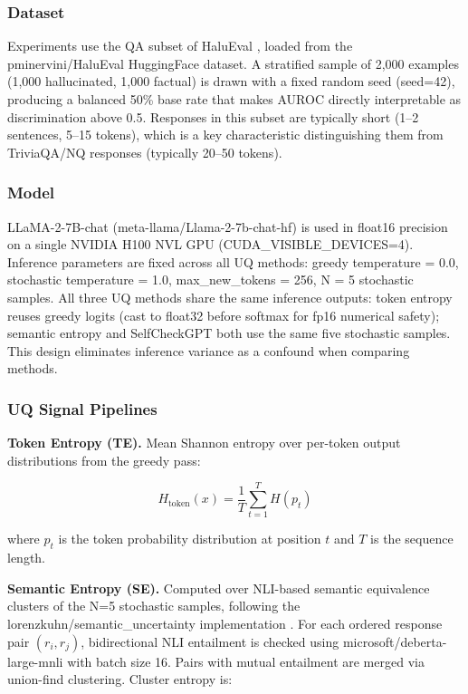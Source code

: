 
\subsubsection{Dataset}

Experiments use the QA subset of HaluEval \citep{Lietal2023}, loaded from the pminervini/HaluEval HuggingFace dataset. A stratified sample of 2,000 examples (1,000 hallucinated, 1,000 factual) is drawn with a fixed random seed (seed=42), producing a balanced 50\% base rate that makes AUROC directly interpretable as discrimination above 0.5. Responses in this subset are typically short (1–2 sentences, 5–15 tokens), which is a key characteristic distinguishing them from TriviaQA/NQ responses (typically 20–50 tokens).

\subsubsection{Model}

LLaMA-2-7B-chat (meta-llama/Llama-2-7b-chat-hf) is used in float16 precision on a single NVIDIA H100 NVL GPU (CUDA_VISIBLE_DEVICES=4). Inference parameters are fixed across all UQ methods: greedy temperature = 0.0, stochastic temperature = 1.0, max_new_tokens = 256, N = 5 stochastic samples. All three UQ methods share the same inference outputs: token entropy reuses greedy logits (cast to float32 before softmax for fp16 numerical safety); semantic entropy and SelfCheckGPT both use the same five stochastic samples. This design eliminates inference variance as a confound when comparing methods.

\subsubsection{UQ Signal Pipelines}

\textbf{Token Entropy (TE).} Mean Shannon entropy over per-token output distributions from the greedy pass:

$$H_\text{token}(x) = \frac{1}{T} \sum_{t=1}^{T} H(p_t)$$

where $p_t$ is the token probability distribution at position $t$ and $T$ is the sequence length.

\textbf{Semantic Entropy (SE).} Computed over NLI-based semantic equivalence clusters of the N=5 stochastic samples, following the lorenzkuhn/semantic_uncertainty implementation \citep{Kuhnetal2023}. For each ordered response pair $(r_i, r_j)$, bidirectional NLI entailment is checked using microsoft/deberta-large-mnli with batch size 16. Pairs with mutual entailment are merged via union-find clustering. Cluster entropy is:

